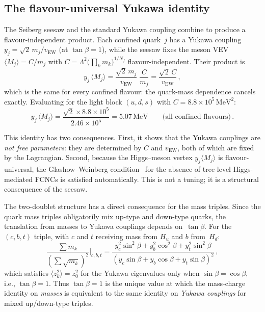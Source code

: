 \documentclass[12pt,a4paper]{article}
\newcommand{\MeV}{\,\text{MeV}}
\begin{document}
\subsection{The flavour-universal Yukawa identity}

The Seiberg seesaw and the standard Yukawa coupling combine to
produce a flavour-independent product. Each confined quark~$j$
has a Yukawa coupling $y_j = \sqrt{2}\,m_j/v_{\text{EW}}$
(at $\tan\beta = 1$), while the seesaw fixes the meson VEV
$\langle M_j\rangle = C/m_j$ with
$C = \Lambda^2\bigl(\prod_k m_k\bigr)^{1/N_f}$ flavour-independent.
Their product is
\begin{equation}
  y_j\,\langle M_j\rangle
  = \frac{\sqrt{2}\,m_j}{v_{\text{EW}}}\;\frac{C}{m_j}
  = \frac{\sqrt{2}\,C}{v_{\text{EW}}}\,,
\end{equation}
which is the same for every confined flavour: the quark-mass
dependence cancels exactly. Evaluating for the light block
$(u,d,s)$ with $C = 8.8 \times 10^5\MeV^2$:
\begin{equation}
  y_j\,\langle M_j\rangle
  = \frac{\sqrt{2} \times 8.8 \times 10^5}{2.46 \times 10^5}
  = 5.07\MeV
  \qquad\text{(all confined flavours)}\,.
\end{equation}

This identity has two consequences. First, it shows that the Yukawa
couplings are \emph{not free parameters}: they are determined by
$C$ and $v_{\text{EW}}$, both of which are fixed by the Lagrangian.
Second, because the Higgs--meson vertex $y_j\langle M_j\rangle$
is flavour-universal, the Glashow--Weinberg
condition~\cite{UTfit} for the absence of tree-level
Higgs-mediated FCNCs is satisfied automatically.
This is not a tuning; it is a structural consequence of the seesaw.

The two-doublet structure has a direct consequence for the mass
triples. Since the quark mass triples obligatorily mix up-type
and down-type quarks, the translation from
masses to Yukawa couplings depends on~$\tan\beta$.
For the $(c,b,t)$ triple, with $c$ and $t$ receiving mass
from $H_u$ and $b$ from~$H_d$:
\begin{equation}
  \frac{\sum m_k}{(\sum\sqrt{m_k})^2}\bigg|_{c,b,t}
  = \frac{y_c^2\sin^2\!\beta + y_b^2\cos^2\!\beta + y_t^2\sin^2\!\beta}
  {(y_c\sin\beta + y_b\cos\beta + y_t\sin\beta)^2}\,,
\end{equation}
which satisfies $\langle z_k^2\rangle = z_0^2$ for the Yukawa eigenvalues
only when $\sin\beta = \cos\beta$,
i.e., $\tan\beta = 1$. Thus $\tan\beta = 1$ is the unique value
at which the mass-charge identity on \emph{masses} is equivalent
to the same identity on \emph{Yukawa couplings} for mixed
up/down-type triples.
\end{document}

